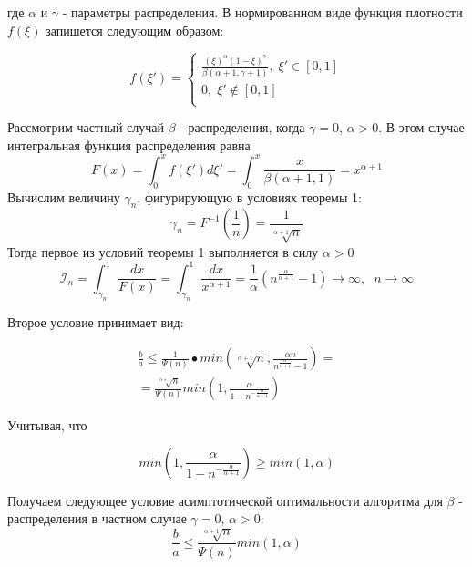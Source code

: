 \documentclass[a4paper, 14pt]{extarticle}
\begin{document}
где $\alpha$ и $\gamma$ - параметры распределения. В нормированном виде функция плотности $f(\xi)$ запишется следующим образом:

\begin{equation}
f(\xi') = 
\begin{cases}
   \frac{(\xi)^\alpha (1-\xi)^\gamma}{ \beta(\alpha+1, \gamma+1)}, \;  \xi' \in [0,1]\\
   0, \;  \xi' \notin [0,1] \\
 \end{cases}
\end{equation}

Рассмотрим частный случай $\beta$ - распределения, когда $\gamma=0$, $\alpha>0$. В этом случае интегральная функция распределения равна
\begin{equation}
F(x) = \int_0^x f(\xi')d\xi' = \int_0^x \frac{x}{\beta(\alpha+1,1)} = x^{\alpha+1}
\end{equation} 
Вычислим величину $\gamma_n$, фигурирующую в условиях теоремы 1:
\begin{equation}
\gamma_n = F^{-1}(\frac{1}{n}) = \frac{1}{\sqrt[\alpha+1]{n}}
\end{equation}
Тогда первое из условий теоремы 1 выполняется в силу $\alpha>0$
\begin{equation}
\mathcal{I}_n = \int_{\gamma_n}^1 \frac{dx}{F(x)} = \int_{\gamma_n}^1 \frac{dx}{x^{\alpha+1}} = \frac{1}{\alpha} (n^{\frac{\alpha}{\alpha+1}}-1) \rightarrow \infty, \; \; n\rightarrow \infty
\end{equation}

Второе условие принимает вид:

\begin{equation}
\begin{aligned}
\frac{b}{a} \leq \frac{1}{\Psi(n)}•min(\sqrt[\alpha+1]{n}, \frac{\alpha n}{n^{\frac{\alpha}{\alpha+1}}-1}) = \\
=\frac{\sqrt[\alpha+1]{n}}{\Psi(n)} min(1, \frac{\alpha}{1-n^{-\frac{\alpha}{\alpha+1}}})
\end{aligned}
\end{equation}

Учитывая, что

\begin{equation}
min(1, \frac{\alpha}{1-n^{-\frac{\alpha}{\alpha+1}}}) \geq min(1, \alpha)
\end{equation}

Получаем следующее условие асимптотической оптимальности алгоритма \text{\algorithm} для $\beta$ - распределения в частном случае $\gamma=0$, $\alpha>0$:
\begin{equation}
\frac{b}{a} \leq \frac{\sqrt[\alpha+1]{n}}{\Psi(n)}min(1,\alpha)
\end{equation}
\end{document}
